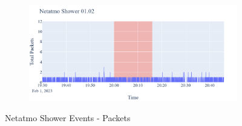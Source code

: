 \begin{figure}[H]
\begin{subfigure}[b]{0.47\textwidth}
        \centering
        \includegraphics[width=1.2\hsize]{figures/Netatmo_Shower_Packets_01.02.png}
    \end{subfigure}
    \caption{Netatmo Shower Events - Packets}
    \label{fig:NetatmoShowerPackets}
\end{figure}

